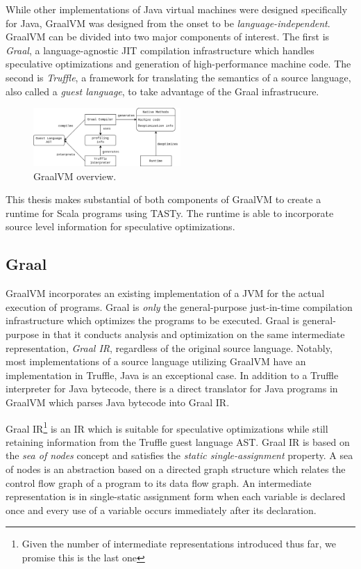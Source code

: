 While other implementations of Java virtual machines were designed specifically for Java, GraalVM was designed from the onset to be \textit{language-independent}.
GraalVM can be divided into two major components of interest. 
The first is \textit{Graal}, a language-agnostic JIT compilation infrastructure which handles speculative optimizations and generation of high-performance machine code.
The second is \textit{Truffle}, a framework for translating the semantics of a source language, also called a \textit{guest language}, to take advantage of the Graal infrastrucure.

\begin{figure}[!htb]
	\centering
	\includegraphics[width=0.5\textwidth]{figures/graalvm-pipeline.png}
	\caption{GraalVM overview\cite{graalvm:ir}.}
\end{figure}

This thesis makes substantial of both components of GraalVM to create a runtime for Scala programs using TASTy.
The runtime is able to incorporate source level information for speculative optimizations.


\subsection{Graal}

GraalVM incorporates an existing implementation of a JVM\cite{java:hotspot} for the actual execution of programs.
Graal is \textit{only} the general-purpose just-in-time compilation infrastructure which optimizes the programs to be executed.
Graal is general-purpose in that it conducts analysis and optimization on the same intermediate representation, \textit{Graal IR}, regardless of the original source language.
Notably, most implementations of a source language utilizing GraalVM have an implementation in Truffle, Java is an exceptional case.
In addition to a Truffle interpreter for Java bytecode\cite{graalvm:espresso}, there is a direct translator for Java programs in GraalVM which parses Java bytecode into Graal IR.

Graal IR\cite{graalvm:ir}\footnote{Given the number of intermediate representations introduced thus far, we promise this is the last one} is an IR which is suitable for speculative optimizations while still retaining information from the Truffle guest language AST.
Graal IR is based on the \textit{sea of nodes} concept\cite{click:sea-of-nodes} and satisfies the \textit{static single-assignment}\cite{ssa} property.
A sea of nodes is an abstraction based on a directed graph structure which relates the control flow graph\cite{allen:ctrl-flow-analysis} of a program to its data flow graph\cite{allen:data-flow-analysis}.
An intermediate representation is in single-static assignment form when each variable is declared once and every use of a variable occurs immediately after its declaration\cite{johnson:use-def-chains}.

